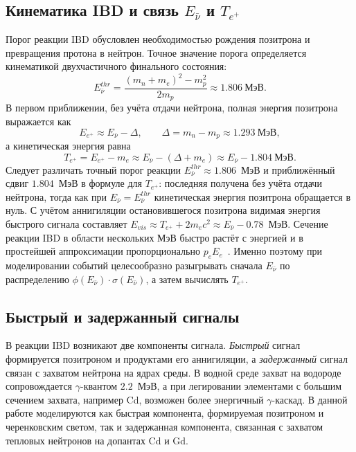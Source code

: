 \documentclass[a4paper,12pt]{extarticle}
\begin{document}
\subsection{Кинематика IBD и связь $E_{\bar{\nu}}$ и $T_{e^+}$}
Порог реакции IBD обусловлен необходимостью рождения позитрона и превращения протона в нейтрон. Точное значение порога определяется кинематикой двухчастичного финального состояния:
\begin{equation}
    E^{thr}_{\bar{\nu}}=\frac{(m_n+m_e)^2-m_p^2}{2m_p}\approx 1.806~\text{МэВ}.
\end{equation}
В первом приближении, без учёта отдачи нейтрона, полная энергия позитрона выражается как
\begin{equation}
    E_{e^+}\approx E_{\bar{\nu}}-\Delta,\qquad \Delta=m_n-m_p\approx 1.293~\text{МэВ},
\end{equation}
а кинетическая энергия равна
\begin{equation}
    T_{e^+}=E_{e^+}-m_e\approx E_{\bar{\nu}}-(\Delta+m_e)\approx E_{\bar{\nu}}-1.804~\text{МэВ}.
\end{equation}
Следует различать точный порог реакции $E^{thr}_{\bar{\nu}}\approx 1.806$~МэВ и приближённый сдвиг $1.804$~МэВ в формуле для $T_{e^+}$: последняя получена без учёта отдачи нейтрона, тогда как при $E_{\bar{\nu}}=E^{thr}_{\bar{\nu}}$ кинетическая энергия позитрона обращается в нуль. С учётом аннигиляции остановившегося позитрона видимая энергия быстрого сигнала составляет $E_{vis}\approx T_{e^+}+2m_ec^2\approx E_{\bar{\nu}}-0.78$~МэВ. Сечение реакции IBD в области нескольких МэВ быстро растёт с энергией и в простейшей аппроксимации пропорционально $p_eE_e$~\cite{vogel1999,strumia2003}. Именно поэтому при моделировании событий целесообразно разыгрывать сначала $E_{\bar{\nu}}$ по распределению $\phi(E_{\bar{\nu}})\cdot\sigma(E_{\bar{\nu}})$, а затем вычислять $T_{e^+}$.

\subsection{Быстрый и задержанный сигналы}
В реакции IBD возникают две компоненты сигнала. \textit{Быстрый} сигнал формируется позитроном и продуктами его аннигиляции, а \textit{задержанный} сигнал связан с захватом нейтрона на ядрах среды. В водной среде захват на водороде сопровождается $\gamma$-квантом $2.2$~МэВ, а при легировании элементами с большим сечением захвата, например Cd, возможен более энергичный $\gamma$-каскад. В данной работе моделируются как быстрая компонента, формируемая позитроном и черенковским светом, так и задержанная компонента, связанная с захватом тепловых нейтронов на допантах Cd и Gd.
\end{document}
